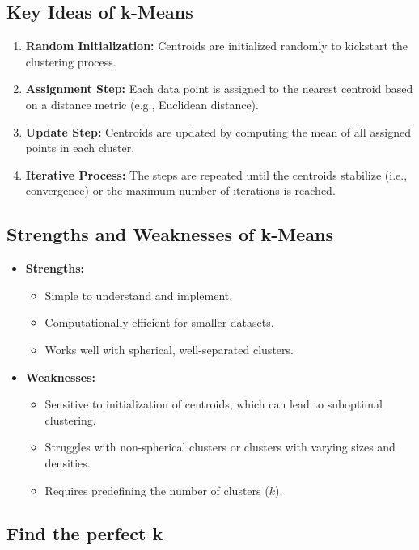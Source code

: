 \documentclass{article}
\begin{document}
\subsection{Key Ideas of k-Means}
\begin{enumerate}
    \item \textbf{Random Initialization:} Centroids are initialized randomly to kickstart the clustering process.
    \item \textbf{Assignment Step:} Each data point is assigned to the nearest centroid based on a distance metric (e.g., Euclidean distance).
    \item \textbf{Update Step:} Centroids are updated by computing the mean of all assigned points in each cluster.
    \item \textbf{Iterative Process:} The steps are repeated until the centroids stabilize (i.e., convergence) or the maximum number of iterations is reached.
\end{enumerate}

\subsection{Strengths and Weaknesses of k-Means}
\begin{itemize}
    \item \textbf{Strengths:}
        \begin{itemize}
            \item Simple to understand and implement.
            \item Computationally efficient for smaller datasets.
            \item Works well with spherical, well-separated clusters.
        \end{itemize}
    \item \textbf{Weaknesses:}
        \begin{itemize}
            \item Sensitive to initialization of centroids, which can lead to suboptimal clustering.
            \item Struggles with non-spherical clusters or clusters with varying sizes and densities.
            \item Requires predefining the number of clusters ($k$).
        \end{itemize}
\end{itemize}

\subsection{Find the perfect k}
\end{document}
